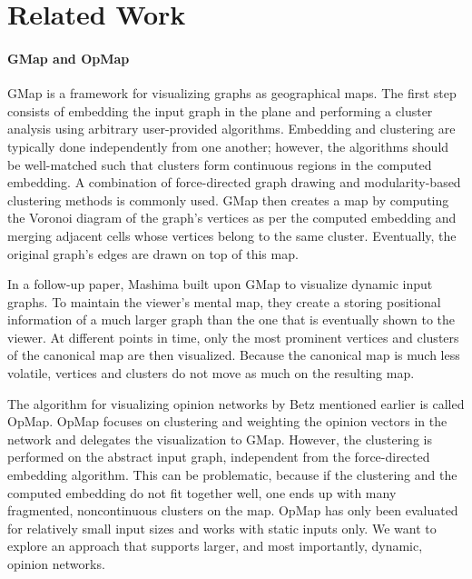 \section{Related Work}
\label{sect:related-work}


\paragraph{GMap and OpMap}

GMap \cite{gansner2009gmap} is a framework for visualizing graphs as geographical maps.
The first step consists of embedding the input graph in the plane and performing a cluster analysis using arbitrary user-provided algorithms.
Embedding and clustering are typically done independently from one another; however, the algorithms should be well-matched such that clusters form continuous regions in the computed embedding.
A combination of force-directed graph drawing and modularity-based clustering methods is commonly used.
GMap then creates a map by computing the Voronoi diagram of the graph's vertices as per the computed embedding and merging adjacent cells whose vertices belong to the same cluster.
Eventually, the original graph's edges are drawn on top of this map.

In a follow-up paper, Mashima \etal{} \cite{mashima2011visualizing} built upon GMap to visualize dynamic input graphs.
To maintain the viewer's mental map, they create a  storing positional information of a much larger graph than the one that is eventually shown to the viewer.
At different points in time, only the most prominent vertices and clusters of the canonical map are then visualized.
Because the canonical map is much less volatile, vertices and clusters do not move as much on the resulting map.

The algorithm for visualizing opinion networks by Betz \etal{} mentioned earlier is called OpMap.
OpMap focuses on clustering and weighting the opinion vectors in the network and delegates the visualization to GMap.
However, the clustering is performed on the abstract input graph, independent from the force-directed embedding algorithm.
This can be problematic, because if the clustering and the computed embedding do not fit together well, one ends up with many fragmented, noncontinuous clusters on the map.
OpMap has only been evaluated for relatively small input sizes and works with static inputs only.
We want to explore an approach that supports larger, and most importantly, dynamic, opinion networks.

